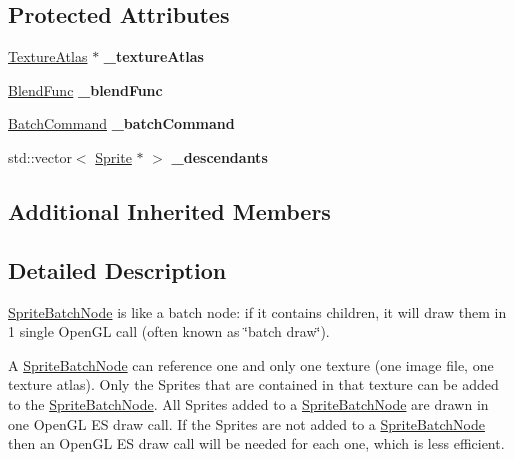 \subsection*{Protected Attributes}
\begin{DoxyCompactItemize}
\item 
\mbox{\label{classSpriteBatchNode_ad08eb47ada2b8f199668937ebd40af35}} 
\hyperlink{classTextureAtlas}{Texture\+Atlas} $\ast$ {\bfseries \+\_\+texture\+Atlas}
\item 
\mbox{\label{classSpriteBatchNode_a05af9c8acceba153267238bd8c40e212}} 
\hyperlink{structBlendFunc}{Blend\+Func} {\bfseries \+\_\+blend\+Func}
\item 
\mbox{\label{classSpriteBatchNode_a134154444f9f0970f8afdabb4b61c5dd}} 
\hyperlink{classBatchCommand}{Batch\+Command} {\bfseries \+\_\+batch\+Command}
\item 
\mbox{\label{classSpriteBatchNode_af2ff2d4eb7906aca134d9f7674abd831}} 
std\+::vector$<$ \hyperlink{classSprite}{Sprite} $\ast$ $>$ {\bfseries \+\_\+descendants}
\end{DoxyCompactItemize}
\subsection*{Additional Inherited Members}


\subsection{Detailed Description}
\hyperlink{classSpriteBatchNode}{Sprite\+Batch\+Node} is like a batch node\+: if it contains children, it will draw them in 1 single Open\+GL call (often known as \char`\"{}batch draw\char`\"{}).

A \hyperlink{classSpriteBatchNode}{Sprite\+Batch\+Node} can reference one and only one texture (one image file, one texture atlas). Only the Sprites that are contained in that texture can be added to the \hyperlink{classSpriteBatchNode}{Sprite\+Batch\+Node}. All Sprites added to a \hyperlink{classSpriteBatchNode}{Sprite\+Batch\+Node} are drawn in one Open\+GL ES draw call. If the Sprites are not added to a \hyperlink{classSpriteBatchNode}{Sprite\+Batch\+Node} then an Open\+GL ES draw call will be needed for each one, which is less efficient.

